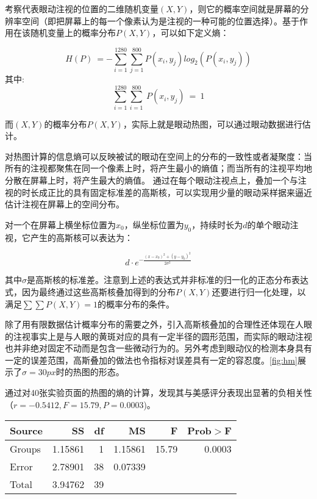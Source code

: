 考察代表眼动注视的位置的二维随机变量$(X, Y)$，则它的概率空间就是屏幕的分辨率空间（即把屏幕上的每一个像素认为是注视的一种可能的位置选择）。基于作用在该随机变量上的概率分布$P(X, Y)$，可以如下定义熵：

$$H(P)~=-\sum_{i=1}^{1280} \sum_{j=1}^{800} P(x_i, y_j)log_2(P(x_i, y_j))$$
其中: $$\sum_{i=1}^{1280}\sum_{i=1}^{800}~P(x_i, y_j)~=~1$$

而$(X, Y)$的概率分布$P(X, Y)$，实际上就是眼动热图，可以通过眼动数据进行估计。

对热图计算的信息熵可以反映被试的眼动在空间上的分布的一致性或者凝聚度：当所有的注视都聚焦在同一个像素上时，将产生最小的熵值；而当所有的注视平均地分散在屏幕上时，将产生最大的熵值。
通过在每个眼动注视点上，叠加一个与注视的时长成正比的具有固定标准差的高斯核，可以实现用少量的眼动采样据来逼近估计注视在屏幕上的空间分布。

对一个在屏幕上横坐标位置为$x_0$，纵坐标位置为$y_0$，持续时长为$d$的单个眼动注视，它产生的高斯核可以表达为：

$$d\cdot e^{-\frac{(x-x_0)^2 + (y-y_0)^2}{2\sigma^2}}$$

其中$\sigma$是高斯核的标准差。注意到上述的表达式并非标准的归一化的正态分布表达式，因为最终通过这些高斯核叠加得到的分布$P(X, Y)$还要进行归一化处理，以满足$\sum\sum P(X, Y) = 1$的概率分布的条件。

除了用有限数据估计概率分布的需要之外，引入高斯核叠加的合理性还体现在人眼的注视事实上是与人眼的黄斑对应的具有一定半径的圆形范围，而实际的眼动注视也并非绝对固定不动而是包含一些微动行为的。另外考虑到眼动仪的检测本身具有一定的误差范围，高斯叠加的做法也令指标对误差具有一定的容忍度。\ref{fig:hm}展示了$\sigma=30px$时的热图的形态。

通过对40张实验页面的热图的熵的计算，发现其与美感评分表现出显著的负相关性（$r = -0.5412, F = 15.79, P = 0.0003$)。

\begin{table}[H]
\centering
\begin{tabular}{lrrrrr}
  \hline
  Source&SS&df&MS&F&Prob$>$F\\ \hline
  Groups&1.15861&1&1.15861&15.79&0.0003\\
  Error&2.78901&38&0.07339&&\\
  Total&3.94762&39&&&\\
  \hline
\end{tabular}
\end{table}

